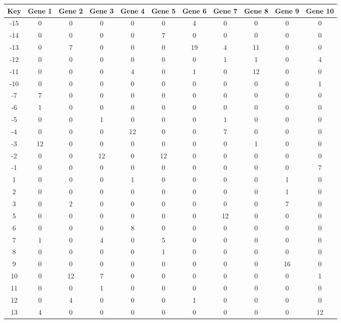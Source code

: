 \begin{tabular}{|c|c|c|c|c|c|c|c|c|c|c|}
\hline
Key & Gene 1 & Gene 2 & Gene 3 & Gene 4 & Gene 5 & Gene 6 & Gene 7 & Gene 8 & Gene 9 & Gene 10 \\
\hline
-15 & 0 & 0 & 0 & 0 & 0 & 4 & 0 & 0 & 0 & 0 \\
-14 & 0 & 0 & 0 & 0 & 7 & 0 & 0 & 0 & 0 & 0 \\
-13 & 0 & 7 & 0 & 0 & 0 & 19 & 4 & 11 & 0 & 0 \\
-12 & 0 & 0 & 0 & 0 & 0 & 0 & 1 & 1 & 0 & 4 \\
-11 & 0 & 0 & 0 & 4 & 0 & 1 & 0 & 12 & 0 & 0 \\
-10 & 0 & 0 & 0 & 0 & 0 & 0 & 0 & 0 & 0 & 1 \\
-7 & 7 & 0 & 0 & 0 & 0 & 0 & 0 & 0 & 0 & 0 \\
-6 & 1 & 0 & 0 & 0 & 0 & 0 & 0 & 0 & 0 & 0 \\
-5 & 0 & 0 & 1 & 0 & 0 & 0 & 1 & 0 & 0 & 0 \\
-4 & 0 & 0 & 0 & 12 & 0 & 0 & 7 & 0 & 0 & 0 \\
-3 & 12 & 0 & 0 & 0 & 0 & 0 & 0 & 1 & 0 & 0 \\
-2 & 0 & 0 & 12 & 0 & 12 & 0 & 0 & 0 & 0 & 0 \\
-1 & 0 & 0 & 0 & 0 & 0 & 0 & 0 & 0 & 0 & 7 \\
1 & 0 & 0 & 0 & 1 & 0 & 0 & 0 & 0 & 1 & 0 \\
2 & 0 & 0 & 0 & 0 & 0 & 0 & 0 & 0 & 1 & 0 \\
3 & 0 & 2 & 0 & 0 & 0 & 0 & 0 & 0 & 7 & 0 \\
5 & 0 & 0 & 0 & 0 & 0 & 0 & 12 & 0 & 0 & 0 \\
6 & 0 & 0 & 0 & 8 & 0 & 0 & 0 & 0 & 0 & 0 \\
7 & 1 & 0 & 4 & 0 & 5 & 0 & 0 & 0 & 0 & 0 \\
8 & 0 & 0 & 0 & 0 & 1 & 0 & 0 & 0 & 0 & 0 \\
9 & 0 & 0 & 0 & 0 & 0 & 0 & 0 & 0 & 16 & 0 \\
10 & 0 & 12 & 7 & 0 & 0 & 0 & 0 & 0 & 0 & 1 \\
11 & 0 & 0 & 1 & 0 & 0 & 0 & 0 & 0 & 0 & 0 \\
12 & 0 & 4 & 0 & 0 & 0 & 1 & 0 & 0 & 0 & 0 \\
13 & 4 & 0 & 0 & 0 & 0 & 0 & 0 & 0 & 0 & 12 \\
\hline
\end{tabular}